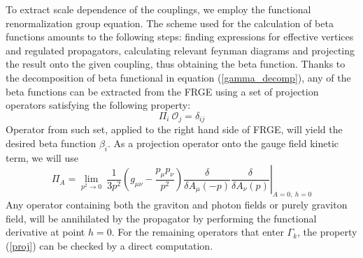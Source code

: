 \documentclass[11pt, a4paper]{article}
\begin{document}
To extract scale dependence of the couplings, we employ the functional renormalization group equation.
The scheme used for the calculation of beta functions amounts to the following steps: finding expressions for effective vertices and
regulated propagators, calculating relevant feynman diagrams and projecting the result onto the given coupling, thus obtaining the beta function.
Thanks to the decomposition of beta functional in equation (\ref{gamma_decomp}), any of the beta functions can be extracted
from the FRGE using a set of projection operators satisfying the following property:
\begin{equation}
    \varPi_i \ \mathcal{O}_j = \delta_{ij}
    \label{proj}
\end{equation}
Operator from such set, applied to the right hand side of FRGE, will yield the desired beta function $\beta_i$.
As a projection operator onto the gauge field kinetic term, we will use
\begin{equation}
    \varPi_A = \left. \lim_{p^2 \rightarrow 0} \ \frac{1}{3 p^2} \left( g_{\mu\nu} - \frac{p_\mu p_\nu}{p^2} \right) \frac{\delta}{\delta A_\mu(-p)} \frac{\delta}{\delta A_\nu(p)} \right|_{A=0, \ h=0}
    \label{projA}
\end{equation}
Any operator containing both the graviton and photon fields or purely graviton field, will be annihilated
by the propagator by performing the functional derivative at point $h=0$. For the remaining operators that enter $\Gamma_k$,
the property (\ref{proj}) can be checked by a direct computation.
\end{document}
